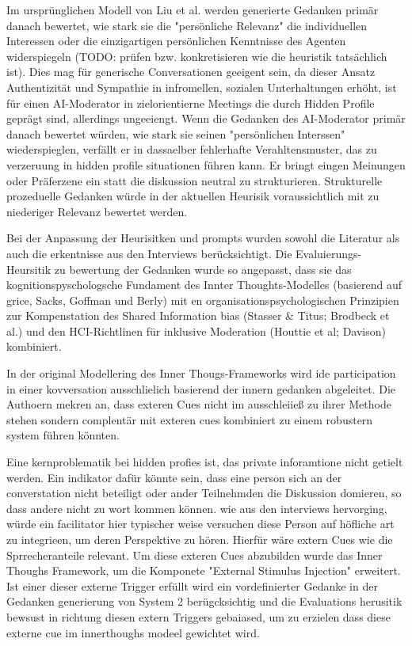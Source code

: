 Im ursprünglichen Modell von Liu et al. werden generierte Gedanken primär danach bewertet, wie stark sie die
"persönliche Relevanz" die individuellen Interessen oder die einzigartigen persönlichen Kenntnisse des
Agenten widerspiegeln (TODO: prüfen bzw. konkretisieren wie die heuristik tatsächlich ist). Dies mag für
generische Conversationen geeigent sein, da dieser Ansatz Authentizität und
Sympathie in infromellen, sozialen Unterhaltungen erhöht, ist für einen AI-Moderator in zielorientierne
Meetings die durch Hidden Profile geprägt sind, allerdings ungeeiengt. Wenn die Gedanken des AI-Moderator
primär danach bewertet würden, wie stark sie seinen "persönlichen Interssen" wiederspieglen, verfällt er in
dassaelber fehlerhafte Verahltensmuster, das zu verzeruung in hidden profile situationen führen kann. Er
bringt eingen Meinungen oder Präferzene ein statt die diskussion neutral zu strukturieren. Strukturelle
prozeduelle Gedanken würde in der aktuellen Heurisik voraussichtlich mit zu niederiger Relevanz bewertet werden.

Bei der Anpassung der Heurisitken und prompts wurden sowohl die Literatur als auch die erkentnisse aus den
Interviews berücksichtigt. Die Evaluierungs-Heursitik zu bewertung der Gedanken wurde so angepasst, dass sie
das kognitionspyschologsche Fundament des Innter Thoughts-Modelles (basierend  auf grice, Sacks, Goffman und
Berly) mit en organisationspsychologischen Prinzipien zur Kompenstation des Shared Information bias (Stasser \&
Titus; Brodbeck et al.) und den HCI-Richtlinen für inklusive Moderation (Houttie et al; Davison) kombiniert.

In der original Modellering des Inner Thougs-Frameworks wird ide participation in einer kovversation
ausschlielich basierend der innern gedanken abgeleitet. Die Authoern mekren an, dass exteren Cues nicht im
ausschleiieß zu ihrer Methode stehen sondern complentär mit exteren cues kombiniert zu einem robustern system
führen könnten. \cite[8.1 Proactive Agents via Intrinsic Motivation vs. Extrinsic
Cues]{liuProactiveConversationalAgents2025}

Eine kernproblematik bei hidden profies ist, das private inforamtione nicht getielt werden. Ein indikator
dafür könnte sein, dass eine person sich an der converstation nicht beteiligt oder ander Teilnehmden die
Diskussion domieren, so dass andere nicht zu wort kommen können. wie aus den interviews
hervorging, würde ein facilitator hier typischer weise versuchen diese Person auf höfliche art zu integrieen,
um deren Perspektive zu hören. Hierfür wäre extern Cues wie die Sprrecheranteile relevant. Um diese
exteren Cues abzubilden wurde das Inner Thoughs Framework, um die Komponete "External Stimulus Injection" erweitert.
Ist einer dieser externe Trigger erfüllt wird ein vordefinierter Gedanke in der Gedanken generierung von
System 2 berügcksichtig und die Evaluations herusitik bewsust in richtung diesen extern Triggers gebaiased,
um zu erzielen dass diese externe cue im innerthoughs modeel gewichtet wird.

